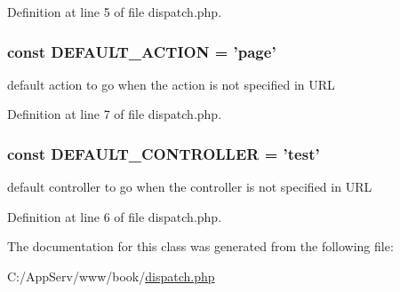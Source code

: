 Definition at line 5 of file dispatch.php.

\hypertarget{class_dispatcher_ae7732757767a78bbaef974ad2821748c}{
\subsubsection[{DEFAULT\_\-ACTION}]{\setlength{\rightskip}{0pt plus 5cm}const {\bf DEFAULT\_\-ACTION} = 'page'}}
\label{class_dispatcher_ae7732757767a78bbaef974ad2821748c}
default action to go when the action is not specified in URL 

Definition at line 7 of file dispatch.php.

\hypertarget{class_dispatcher_ae05204cd87e8b77b35a92c595e4d897a}{
\subsubsection[{DEFAULT\_\-CONTROLLER}]{\setlength{\rightskip}{0pt plus 5cm}const {\bf DEFAULT\_\-CONTROLLER} = 'test'}}
\label{class_dispatcher_ae05204cd87e8b77b35a92c595e4d897a}
default controller to go when the controller is not specified in URL 

Definition at line 6 of file dispatch.php.



The documentation for this class was generated from the following file:\begin{DoxyCompactItemize}
\item 
C:/AppServ/www/book/\hyperlink{dispatch_8php}{dispatch.php}\end{DoxyCompactItemize}

